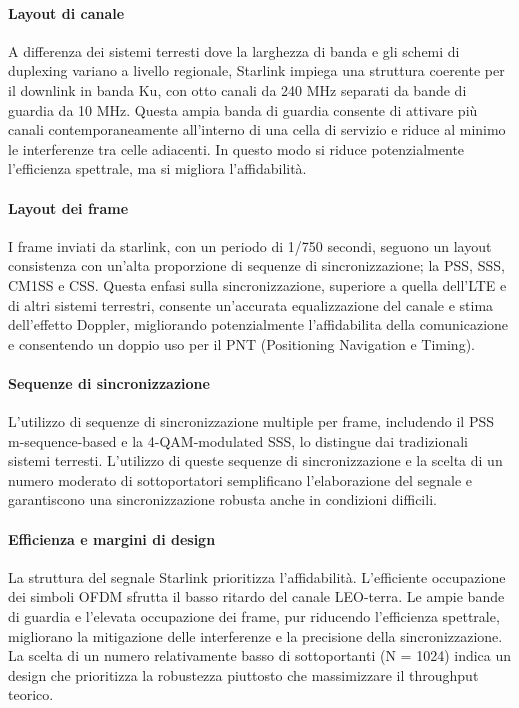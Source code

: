 \paragraph{Layout di canale} A differenza dei sistemi terresti dove la larghezza di banda e gli schemi di duplexing variano a livello regionale, Starlink impiega una struttura coerente per il downlink in banda Ku, con otto canali da 240 MHz separati da bande di guardia da 10 MHz.
Questa ampia banda di guardia consente di attivare più canali contemporaneamente all'interno di una cella di servizio e riduce al minimo le interferenze tra celle adiacenti.
In questo modo si riduce potenzialmente l'efficienza spettrale, ma si migliora l'affidabilità.

\paragraph{Layout dei frame}
I frame inviati da starlink, con un periodo di 1/750 secondi, seguono un layout consistenza con un'alta proporzione di sequenze di sincronizzazione; la PSS, SSS, CM1SS e CSS.
Questa enfasi sulla sincronizzazione, superiore a quella dell'LTE e di altri sistemi terrestri, consente un'accurata equalizzazione del canale e stima dell'effetto Doppler, migliorando potenzialmente l'affidabilita della comunicazione e consentendo un doppio uso per il PNT (Positioning Navigation e Timing).

\paragraph{Sequenze di sincronizzazione}
L'utilizzo di sequenze di sincronizzazione multiple per frame, includendo il PSS m-sequence-based e la 4-\ac{QAM}-modulated SSS, lo distingue dai tradizionali sistemi terresti.
L'utilizzo di queste sequenze di sincronizzazione e la scelta di un numero moderato di sottoportatori semplificano l'elaborazione del segnale e garantiscono una sincronizzazione robusta anche in condizioni difficili.

\paragraph{Efficienza e margini di design}
La struttura del segnale Starlink prioritizza l'affidabilità.
L'efficiente occupazione dei simboli OFDM sfrutta il basso ritardo del canale \ac{LEO}-terra.
Le ampie bande di guardia e l'elevata occupazione dei frame, pur riducendo l'efficienza spettrale, migliorano la mitigazione delle interferenze e la precisione della sincronizzazione.
La scelta di un numero relativamente basso di sottoportanti (N = 1024) indica un design che prioritizza la robustezza piuttosto che massimizzare il throughput teorico.

